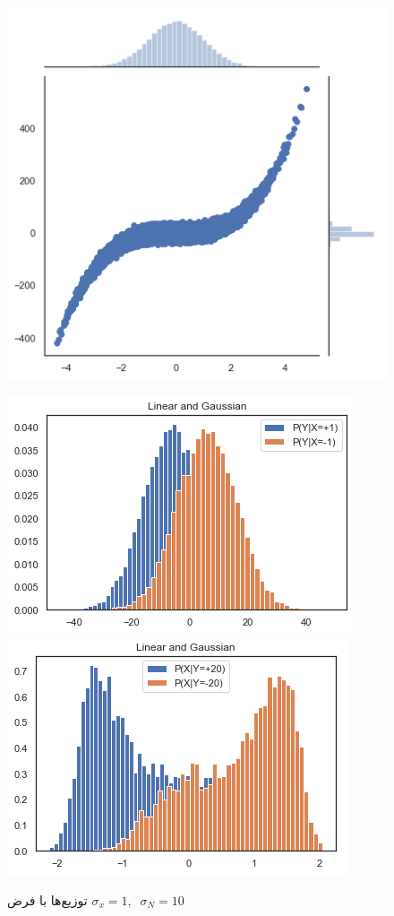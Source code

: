 \documentclass[papersize=a4]{report}
\begin{document}
\begin{enumerate}
	\begin{figure}
		\centering
		\includegraphics[scale=0.35]{non_con1.png}
		\begin{floatrow}
			\includegraphics[scale=0.35]{non_cond2.png}
			\includegraphics[scale=0.35]{non_cond3.png}
		\end{floatrow}
		\caption{توزیع‌ها با فرض 	
			$\sigma_x =1,\;\; \sigma_N = 10$}
		\label{2}
	\end{figure}
	
\end{enumerate}
\end{document}
